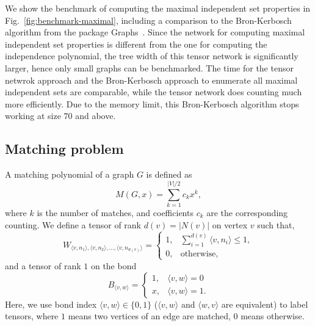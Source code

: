 \documentclass[onefignum, onetabnum]{siamart190516}
\newcommand{\<}{\langle}
\renewcommand{\>}{\rangle}
\newcommand{\Fig}[1]{Fig.~\ref{#1}}
\begin{document}
We show the benchmark of computing the maximal independent set properties in \Fig{fig:benchmark-maximal},
including a comparison to the Bron-Kerbosch algorithm from the package Graphs~\cite{Graphs}.
Since the network for computing maximal independent set properties is different from the one for computing the independence polynomial,
the tree width of this tensor network is significantly larger, hence only small graphs can be benchmarked.
The time for the tensor netwrok approach and the Bron-Kerbosch approach to enumerate all maximal independent sets are comparable,
while the tensor network does counting much more efficiently.
Due to the memory limit, this Bron-Kerbosch algorithm stops working at size $70$ and above.


\subsection{Matching problem}
A matching polynomial of a graph $G$ is defined as
\begin{equation}
    M(G, x) = \sum\limits_{k=1}^{|V|/2} c_k x^k,
\end{equation}
where $k$ is the number of matches, and coefficients $c_k$ are the corresponding counting.
We define a tensor of rank $d(v) = |N(v)|$ on vertex $v$ such that,
\begin{equation}
    W_{\langle v, n_1\rangle, \langle v, n_2 \rangle, \ldots, \langle v, n_{d(v)}\rangle} = \begin{cases}
        1, & \sum_{i=1}^{d(v)} \langle v, n_i \rangle \leq 1,\\
        0, & \text{otherwise},
    \end{cases}
\end{equation}
and a tensor of rank $1$ on the bond
\begin{equation}
    B_{\langle v, w\rangle} = \begin{cases}
    1, & \langle v, w \rangle = 0 \\
    x, & \langle v, w \rangle = 1.
\end{cases}
\end{equation}
Here, we use bond index $\langle v, w \rangle \in \{0, 1\}$ ($\langle v, w \rangle$ and $\langle w,v\rangle$ are equivalent) to label tensors,
where $1$ means two vertices of an edge are matched, $0$ means otherwise.
\end{document}
